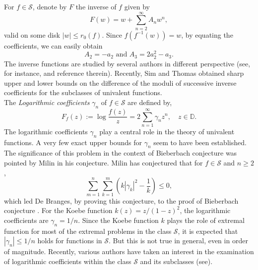 \documentclass[a4paper,12pt]{amsart}
\theoremstyle{definition}
\numberwithin{equation}{section}
\begin{document}
For $f\in \mathcal{S}$, denote by $F$ the inverse of $f$ given by
\begin{equation}\label{InverseFunction}
F(w)=w+\sum_{n=2}^{\infty}A_nw^n,
\end{equation}
valid on some disk $|w|\le r_0(f)$.
Since $f(f^{-1}(w))=w$, by equating the coefficients, we can easily obtain
\begin{equation}\label{A2}
	A_2=-a_2 \text{ and } A_3=2a_2^2-a_3.
\end{equation}
The inverse functions are studied by several authors in different perspective (see, for instance, \cite{vasu-book-2018, SimT20} and reference therein). Recently, Sim and Thomas \cite{SimT20,ST21} obtained sharp upper and lower bounds on the difference of the moduli of successive inverse coefficients for the subclasses of univalent functions.\\[2mm]
The {\it Logarithmic coefficients} $\gamma_{n}$ of $f\in \mathcal{S}$ are defined by,
\begin{equation}\label{amal-1}
	F_{f}(z):= \log\frac{f(z)}{z}=2\sum\limits_{n=1}^{\infty}\gamma_{n}z^{n}, \quad z \in \mathbb{D}.
\end{equation}
The logarithmic coefficients $\gamma_{n}$ play a central role in the theory of univalent functions. A very few exact upper bounds for $\gamma_{n}$ seem to have been established. The significance of this problem in the context of Bieberbach conjecture was pointed by Milin\cite{milin} in his conjecture. Milin \cite{milin} has conjectured that for $f\in \mathcal{S}$ and $n\ge 2$, 
$$\sum\limits_{m=1}^{n}\sum\limits_{k=1}^{m}\left(k|\gamma_{k}|^{2}-\frac{1}{k}\right)\le 0,$$
which led De Branges, by proving this conjecture, to the proof of Bieberbach conjecture  \cite{DeB}. For the Koebe function $k(z)=z/(1-z)^{2}$, the logarithmic coefficients are $\gamma_{n}=1/n$. Since the Koebe function $k$ plays the role of extremal function for most of the extremal problems in the class $\mathcal{S}$, it is expected that $|\gamma_{n}|\le1/n$ holds for functions in $\mathcal{S}$. But this is not true in general, even in order of magnitude. Recently, various authors have taken an interest in the examination of logarithmic coefficients within the class $\mathcal{S}$ and its subclasses (see\cite{vasu2017,ALT,Thomas-2016}).
\end{document}

